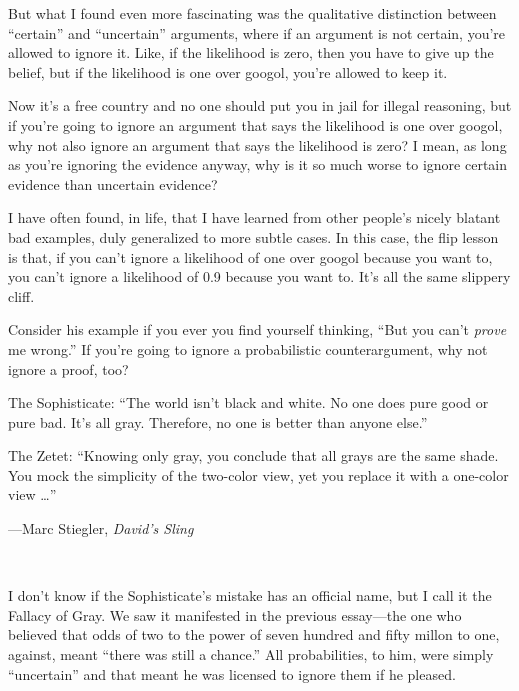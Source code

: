 {
 But what I found even more fascinating was the qualitative
distinction between ``certain'' and
``uncertain'' arguments, where if an
argument is not certain, you're allowed to ignore it.
Like, if the likelihood is zero, then you have to give up the belief,
but if the likelihood is one over googol, you're
allowed to keep it.}

{
 Now it's a free country and no one should put you
in jail for illegal reasoning, but if you're going to
ignore an argument that says the likelihood is one over googol, why not
also ignore an argument that says the likelihood is zero? I mean, as
long as you're ignoring the evidence anyway, why is it
so much worse to ignore certain evidence than uncertain evidence?}

{
 I have often found, in life, that I have learned from other
people's nicely blatant bad examples, duly generalized
to more subtle cases. In this case, the flip lesson is that, if you
can't ignore a likelihood of one over googol because
you want to, you can't ignore a likelihood of 0.9
because you want to. It's all the same slippery cliff.}

{
 Consider his example if you ever you find yourself thinking,
``But you can't \textit{prove} me
wrong.'' If you're going to ignore a
probabilistic counterargument, why not ignore a proof, too?}

\myendsectiontext


{
 The Sophisticate: ``The world
isn't black and white. No one does pure good or pure
bad. It's all gray. Therefore, no one is better than
anyone else.''}

{
 The Zetet: ``Knowing only gray, you conclude that
all grays are the same shade. You mock the simplicity of the two-color
view, yet you replace it with a one-color view
\ldots''}

{\raggedleft
 {}---Marc Stiegler, \textit{David's
Sling}
\par}


\bigskip

{
 ~}

{
 I don't know if the Sophisticate's
mistake has an official name, but I call it the Fallacy of Gray. We saw
it manifested in the previous essay---the one who believed that odds of
two to the power of seven hundred and fifty millon to one, against,
meant ``there was still a chance.''
All probabilities, to him, were simply
``uncertain'' and that meant he was
licensed to ignore them if he pleased.}

